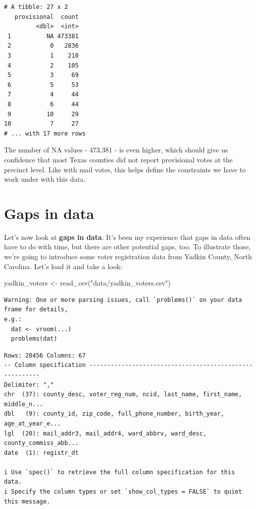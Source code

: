 \documentclass[
  letterpaper,
  DIV=11,
  numbers=noendperiod]{scrreprt}
\newenvironment{Shaded}{\begin{snugshade}}{\end{snugshade}}
\newcommand{\FunctionTok}[1]{\textcolor[rgb]{0.28,0.35,0.67}{#1}}
\newcommand{\NormalTok}[1]{\textcolor[rgb]{0.00,0.23,0.31}{#1}}
\newcommand{\OtherTok}[1]{\textcolor[rgb]{0.00,0.23,0.31}{#1}}
\newcommand{\StringTok}[1]{\textcolor[rgb]{0.13,0.47,0.30}{#1}}
\begin{document}
\begin{verbatim}
# A tibble: 27 x 2
   provisional  count
         <dbl>  <int>
 1          NA 473381
 2           0   2836
 3           1    210
 4           2    105
 5           3     69
 6           5     53
 7           4     44
 8           6     44
 9          10     29
10           7     27
# ... with 17 more rows
\end{verbatim}

The number of NA values - 473,381 - is even higher, which should give us
confidence that most Texas counties did not report provisional votes at
the precinct level. Like with mail votes, this helps define the
constraints we have to work under with this data.

\hypertarget{gaps-in-data}{%
\section{Gaps in data}\label{gaps-in-data}}

Let's now look at \textbf{gaps in data}. It's been my experience that
gaps in data often have to do with time, but there are other potential
gaps, too. To illustrate those, we're going to introduce some voter
registration data from Yadkin County, North Carolina. Let's load it and
take a look:

\begin{Shaded}
\begin{Highlighting}[]
\NormalTok{yadkin\_voters }\OtherTok{\textless{}{-}} \FunctionTok{read\_csv}\NormalTok{(}\StringTok{"data/yadkin\_voters.csv"}\NormalTok{)}
\end{Highlighting}
\end{Shaded}

\begin{verbatim}
Warning: One or more parsing issues, call `problems()` on your data frame for details,
e.g.:
  dat <- vroom(...)
  problems(dat)
\end{verbatim}

\begin{verbatim}
Rows: 28456 Columns: 67
-- Column specification --------------------------------------------------------
Delimiter: ","
chr  (37): county_desc, voter_reg_num, ncid, last_name, first_name, middle_n...
dbl   (9): county_id, zip_code, full_phone_number, birth_year, age_at_year_e...
lgl  (20): mail_addr3, mail_addr4, ward_abbrv, ward_desc, county_commiss_abb...
date  (1): registr_dt

i Use `spec()` to retrieve the full column specification for this data.
i Specify the column types or set `show_col_types = FALSE` to quiet this message.
\end{verbatim}
\end{document}
